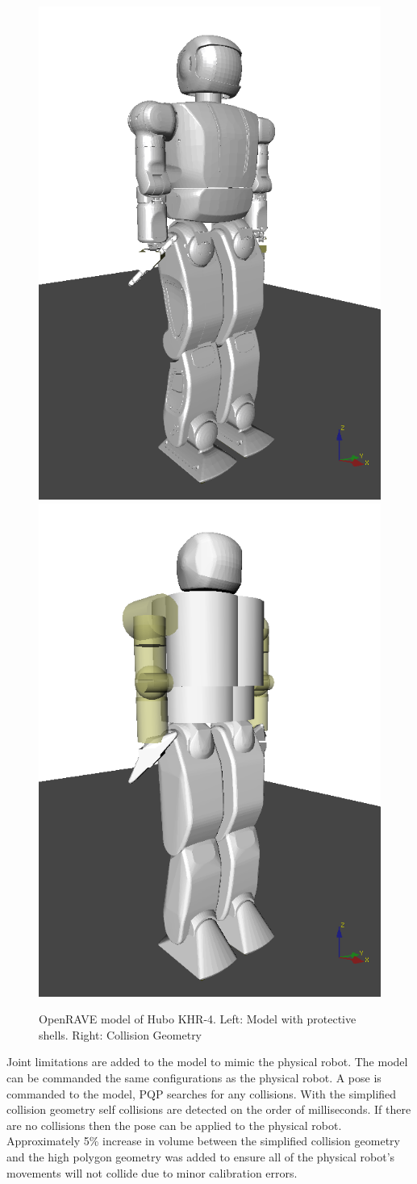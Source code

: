 \begin{figure}[thpb]
  \centering
\includegraphics[width=0.5\columnwidth]{./pictures/final/hBody.png}\includegraphics[width=0.5\columnwidth]{./pictures/final/hCol.png}
  \caption{OpenRAVE model of Hubo KHR-4. Left: Model with protective shells.  Right: Collision Geometry  }
  \label{fig:vHubo}
\end{figure}

Joint limitations are added to the model to mimic the physical robot.  The model can be commanded the same configurations as the physical robot.  A pose is commanded to the model, PQP searches for any collisions.  With the simplified collision geometry self collisions are detected on the order of milliseconds.  If there are no collisions then the pose can be applied to the physical robot.  Approximately 5\% increase in volume between the simplified collision geometry and the high polygon geometry was added to ensure all of the physical robot's movements will not collide due to minor calibration errors.


